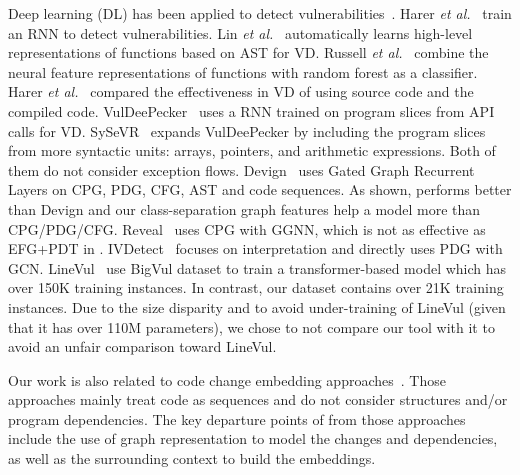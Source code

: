 Deep learning (DL) has been applied
to detect
vulnerabilities~\cite{scandariato2014predicting,neuhaus2007predicting,shin2010evaluating,neuhaus2009beauty,yamaguchi2012generalized,yamaguchi2011vulnerability}.
Harer {\em et al.}~\cite{harer2018learning} train an RNN to detect
vulnerabilities. Lin {\em et al.}~\cite{lin2017poster} automatically
learns high-level representations of functions based on AST for
VD. Russell {\em et al.}~\cite{russell2018automated} combine the
neural feature representations of functions with random forest as a
classifier.
Harer {\em et al.}~\cite{harer2018automated} compared the
effectiveness in VD of using source code and the compiled
code. VulDeePecker~\cite{li2018vuldeepecker} uses a RNN trained on
program slices from API calls for VD. SySeVR~\cite{li2021sysevr}
expands VulDeePecker by including the program slices from more
syntactic units: arrays, pointers, and arithmetic expressions. Both of
them do not consider exception flows. Devign~\cite{zhou2019devign}
uses Gated Graph Recurrent Layers on CPG, PDG, CFG, AST and code
sequences. As shown, {\tool} performs better than Devign and our
class-separation graph features help a model more than CPG/PDG/CFG.
Reveal~\cite{chakraborty2020deep} uses CPG with GGNN, which is not as
effective as EFG+PDT in {\tool}.  IVDetect~\cite{fse21} focuses on
interpretation and directly uses PDG with
GCN. LineVul~\cite{linevul-msr22} use BigVul dataset to train a
transformer-based model which has over 150K training instances. In
contrast, our dataset contains over 21K training instances. Due to the
size disparity and to avoid under-training of LineVul (given that it
has over 110M parameters), we chose to not compare our tool with it to
avoid an unfair comparison toward LineVul.

Our work is also related to code change embedding
approaches~\cite{cc2vec,commit2vec}. Those approaches mainly treat
code as sequences and do not consider structures and/or program
dependencies. The key departure points of {\tool} from those
approaches include the use of graph representation to model the
changes and dependencies, as well as the surrounding context to build
the embeddings.






